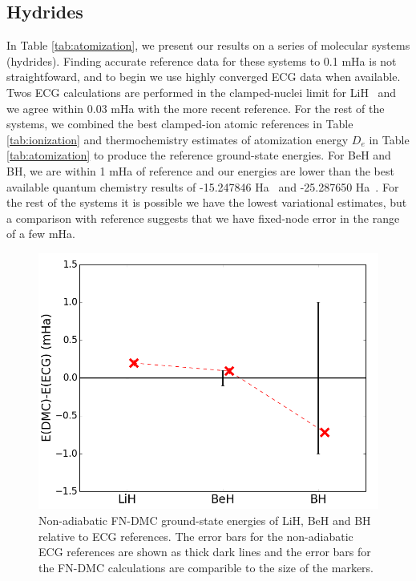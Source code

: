 \documentclass[pra,superscriptaddress,groupedaddress,twocolumn]{revtex4}
\begin{document}
\subsection{Hydrides}


In Table \ref{tab:atomization}, we present our results on a series of molecular systems (hydrides). Finding accurate reference data for these systems to 0.1 mHa is not straightfoward, and to begin we use highly converged ECG data when available. Twos ECG calculations are performed in the clamped-nuclei limit for LiH~\cite{Cencek_LiH,Adamowicz_LiH} and we agree within 0.03 mHa with the more recent reference. For the rest of the systems, we combined the best clamped-ion atomic references in Table \ref{tab:ionization} and thermochemistry estimates of atomization energy $D_e$ in Table \ref{tab:atomization} to produce the reference ground-state energies. For BeH and BH, we are within 1 mHa of reference and our energies are lower than the best available quantum chemistry results of -15.247846 Ha~\cite{Koput_BeH} and -25.287650 Ha~\cite{Miliordos_BH}. For the rest of the systems it is possible we have the lowest variational estimates, but a comparison with reference suggests that we have fixed-node error in the range of a few mHa.

\begin{figure}[h]
\centering
\includegraphics[scale=.37]{Figures/dia-ECG}
\caption{Non-adiabatic FN-DMC ground-state energies of LiH, BeH and BH relative to ECG references. The error bars for the non-adiabatic ECG references are shown as thick dark lines and the error bars for the FN-DMC calculations are comparible to the size of the markers. \label{fig:dia-ECG}}
\end{figure}
\end{document}

